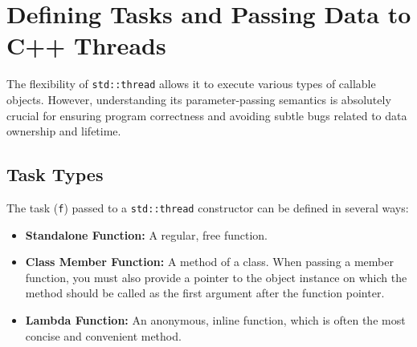 \documentclass{article} %
\begin{document}
\section{Defining Tasks and Passing Data to C++ Threads}
The flexibility of \texttt{std::thread} allows it to execute various types of callable objects. However, understanding its parameter-passing semantics is absolutely crucial for ensuring program correctness and avoiding subtle bugs related to data ownership and lifetime.

\subsection{Task Types}
The task (\texttt{f}) passed to a \texttt{std::thread} constructor can be defined in several ways:
\begin{itemize}
    \item \textbf{Standalone Function:} A regular, free function.
    \item \textbf{Class Member Function:} A method of a class. When passing a member function, you must also provide a pointer to the object instance on which the method should be called as the first argument after the function pointer.
    \item \textbf{Lambda Function:} An anonymous, inline function, which is often the most concise and convenient method.
\end{itemize}
\end{document}
